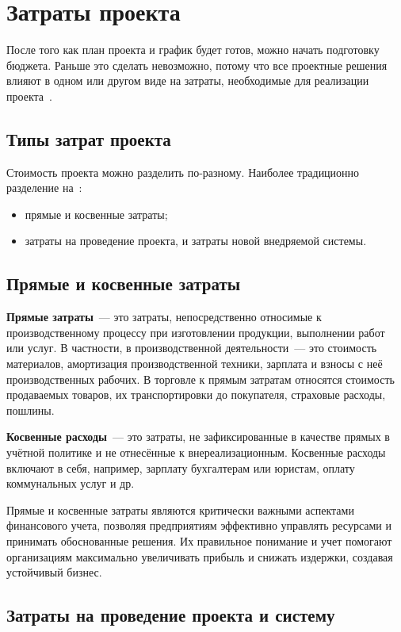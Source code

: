 \chapter{Затраты проекта}

После того как план проекта и график будет готов, можно начать подготовку бюджета. 
Раньше это сделать невозможно, потому что все проектные решения влияют в одном или другом  виде на затраты, необходимые для реализации проекта~\cite{project2}.

\section{Типы затрат проекта}
Стоимость проекта можно разделить по-разному. Наиболее традиционно разделение на~\cite{project2}:
\begin{itemize}
	\item прямые и косвенные затраты;
	\item затраты на проведение проекта, и затраты новой внедряемой системы. 
\end{itemize}

\section{Прямые и косвенные затраты}
\textbf{Прямые затраты}~--- это затраты, непосредственно относимые к производственному процессу при изготовлении продукции, выполнении работ или услуг. 
В частности, в производственной деятельности~--- это стоимость материалов, амортизация производственной техники, зарплата и взносы с неё производственных рабочих. 
В торговле к прямым затратам относятся стоимость продаваемых товаров, их транспортировки до покупателя, страховые расходы, пошлины.

\textbf{Косвенные расходы}~--- это затраты, не зафиксированные в качестве прямых в учётной политике и не отнесённые к внереализационным.
Косвенные расходы включают в себя, например, зарплату бухгалтерам или юристам, оплату коммунальных услуг и др.

Прямые и косвенные затраты являются критически важными аспектами финансового учета, позволяя предприятиям эффективно управлять ресурсами и принимать обоснованные решения. 
Их правильное понимание и учет помогают организациям максимально увеличивать прибыль и снижать издержки, создавая устойчивый бизнес.

\section{Затраты на проведение проекта и систему}

